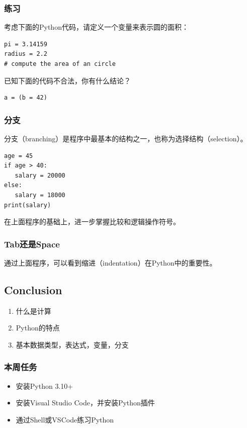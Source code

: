\documentclass[aspectratio=169, 14pt]{beamer}
\begin{document}
\begin{frame}[fragile]
	\frametitle{练习}
	考虑下面的Python代码，请定义一个变量来表示圆的面积：

	\begin{verbatim}
pi = 3.14159
radius = 2.2
# compute the area of an circle
\end{verbatim}

	\pause
	已知下面的代码不合法，你有什么结论？

	\begin{verbatim}
a = (b = 42)
\end{verbatim}
\end{frame}

\begin{frame}[fragile]
	\frametitle{分支}
	\alert{分支}（branching）是程序中最基本的结构之一，也称为选择结构（selection）。

	\begin{verbatim}
age = 45
if age > 40:
   salary = 20000
else:
   salary = 18000
print(salary)
\end{verbatim}

	在上面程序的基础上，进一步掌握比较和逻辑操作符号。
\end{frame}

\begin{frame}
	\frametitle{Tab还是Space}

	通过上面程序，可以看到\alert{缩进}（indentation）在Python中的重要性。

\end{frame}

\begin{frame}
	\section{\textcolor{darkmidnightblue}{Conclusion}}
	\begin{enumerate}
		\item 什么是计算
		\item Python的特点
		\item 基本数据类型，表达式，变量，分支
	\end{enumerate}
\end{frame}

\begin{frame}
	\frametitle{本周任务}
	\begin{itemize}
		\item 安装Python 3.10+
		\item 安装Visual Studio Code，并安装Python插件
		\item 通过Shell或VSCode练习Python
	\end{itemize}
\end{frame}
\end{document}
